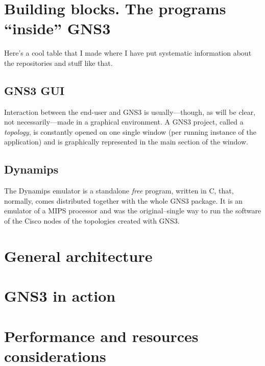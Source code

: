 
\section{Building blocks. The programs ``inside'' GNS3}
\label{sec:gns3buildingblocks}

Here's a cool table that I made where I have put systematic information about the repositories and stuff like that.



\subsection{GNS3 GUI}
\label{subsec:gns3gui}

Interaction between the end-user and GNS3 is usually---though, as will be clear, not necessarily---made in a graphical environment.
A GNS3 project, called a \emph{topology}, is constantly opened on one single window (per running instance of the application) and is graphically represented in the main section of the window.

\subsection{Dynamips}
\label{subsec:gns3dynamips}

The Dynamips emulator is a standalone \emph{free} program, written in C, that, normally, comes distributed together with the whole GNS3 package.
It is an emulator of a MIPS processor and was the original--single way to run the software of the Cisco nodes of the topologies created with GNS3.


\section{General architecture}
\label{sec:gns3architecture}


\section{GNS3 in action}
\label{sec:gns3inaction}


\section{Performance and resources considerations}
\label{sec:gns3performance}


